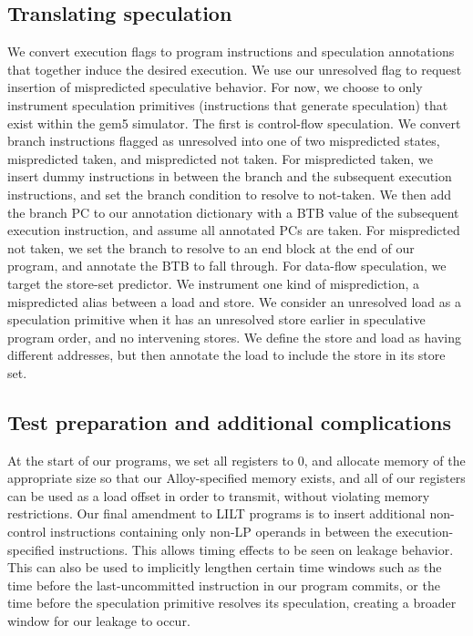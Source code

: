 \subsection{Translating speculation}
We convert execution flags to program instructions and speculation annotations that together induce the desired execution. We use our unresolved flag to request insertion of mispredicted speculative behavior. For now, we choose to only instrument speculation primitives (instructions that generate speculation) that exist within the gem5 simulator. The first is control-flow speculation. We convert branch instructions flagged as unresolved into one of two mispredicted states, mispredicted taken, and mispredicted not taken. For mispredicted taken, we insert dummy instructions in between the branch and the subsequent execution instructions, and set the branch condition to resolve to not-taken. We then add the branch PC to our annotation dictionary with a BTB value of the subsequent execution instruction, and assume all annotated PCs are taken. For mispredicted not taken, we set the branch to resolve to an end block at the end of our program, and annotate the BTB to fall through. For data-flow speculation, we target the store-set predictor. We instrument one kind of misprediction, a mispredicted alias between a load and store. We consider an unresolved load as a speculation primitive when it has an unresolved store earlier in speculative program order, and no intervening stores. We define the store and load as having different addresses, but then annotate the load to include the store in its store set. 

\subsection{Test preparation and additional complications}
At the start of our programs, we set all registers to 0, and allocate memory of the appropriate size so that our Alloy-specified memory exists, and all of our registers can be used as a load offset in order to transmit, without violating memory restrictions. Our final amendment to LILT programs is to insert additional non-control instructions containing only non-LP operands in between the execution-specified instructions. This allows timing effects to be seen on leakage behavior. This can also be used to implicitly lengthen certain time windows such as the time before the last-uncommitted instruction in our program commits, or the time before the speculation primitive resolves its speculation, creating a broader window for our leakage to occur. 


